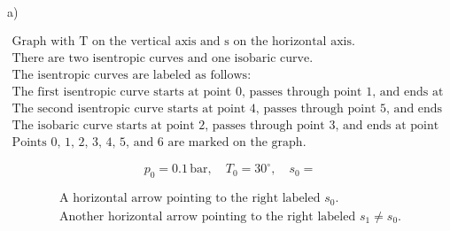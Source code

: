 a) 

\[
\begin{array}{c}
\text{Graph with T on the vertical axis and s on the horizontal axis.} \\
\text{There are two isentropic curves and one isobaric curve.} \\
\text{The isentropic curves are labeled as follows:} \\
\text{The first isentropic curve starts at point 0, passes through point 1, and ends at point 2.} \\
\text{The second isentropic curve starts at point 4, passes through point 5, and ends at point 6.} \\
\text{The isobaric curve starts at point 2, passes through point 3, and ends at point 4.} \\
\text{Points 0, 1, 2, 3, 4, 5, and 6 are marked on the graph.}
\end{array}
\]

\[
p_0 = 0.1 \, \text{bar}, \quad T_0 = 30^\circ, \quad s_0 = 
\]

\[
\begin{array}{c}
\text{A horizontal arrow pointing to the right labeled } s_0. \\
\text{Another horizontal arrow pointing to the right labeled } s_1 \neq s_0.
\end{array}
\]